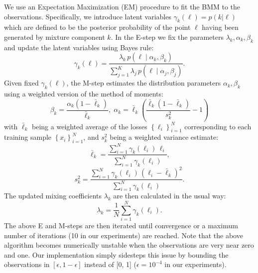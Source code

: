 \documentclass{article}
\begin{document}
We use an Expectation Maximization (EM) procedure to fit the BMM to
the observations. Specifically, we introduce latent variables $\ensuremath{\gamma_{k}(\ell)=p(k|\ell)}$
which are defined to be the posterior probability of the point $\ell$
having been generated by mixture component $\ensuremath{k}$. In the
E-step we fix the parameters $\ensuremath{\lambda_{k},\alpha_{k},\beta_{k}}$
and update the latent variables using Bayes rule: 
\begin{equation}
\gamma_{k}(\ell)=\frac{\lambda_{k}\,p\!\left(\ell\mid\alpha_{k},\beta_{k}\right)}{\sum_{j=1}^{K}\lambda_{j}\,p\!\left(\ell\mid\alpha_{j},\beta_{j}\right)}.
\end{equation}
Given fixed $\ensuremath{\gamma_{k}(\ell)}$, the M-step estimates
the distribution parameters $\ensuremath{\alpha_{k},\beta_{k}}$ using
a weighted version of the method of moments: 
\begin{equation}
\beta_{k}=\frac{\alpha_{k}\left(1-\bar{\ell}_{k}\right)}{\bar{\ell}_{k}},\;\alpha_{k}=\bar{\ell}_{k}\left(\frac{\bar{\ell}_{k}\left(1-\bar{\ell}_{k}\right)}{s_{k}^{2}}-1\right)
\end{equation}
with $\bar{\ell}_{k}$ being a weighted average of the losses $\left\{ \ell_{i}\right\} _{i=1}^{N}$
corresponding to each training sample $\left\{ x_{i}\right\} _{i=1}^{N}$,
and $s_{k}^{2}$ being a weighted variance estimate: 
\begin{equation}
\bar{\ell}_{k}=\frac{\sum_{i=1}^{N}\gamma_{k}(\ell_{i})\,\ell_{i}}{\sum_{i=1}^{N}\gamma_{k}(\ell_{i})},
\end{equation}
\begin{equation}
s_{k}^{2}=\frac{\sum_{i=1}^{N}\gamma_{k}(\ell_{i})\,\left(\ell_{i}-\bar{\ell}_{k}\right)^{2}}{\sum_{i=1}^{N}\gamma_{k}(\ell_{i})}.
\end{equation}
The updated mixing coefficients $\ensuremath{\lambda_{k}}$ are then
calculated in the usual way: 
\begin{equation}
\ensuremath{\lambda_{k}}=\frac{1}{N}\sum_{i=1}^{N}\gamma_{k}(\ell_{i}).
\end{equation}
The above E and M-steps are then iterated until convergence or a maximum
number of iterations (10 in our experiments) are reached. Note that
the above algorithm becomes numerically unstable when the observations
are very near zero and one. Our implementation simply sidesteps this
issue by bounding the observations in $\left[\epsilon,1-\epsilon\right]$
instead of {[}0, 1{]} ($\epsilon=10^{-4}$ in our experiments).
\end{document}
